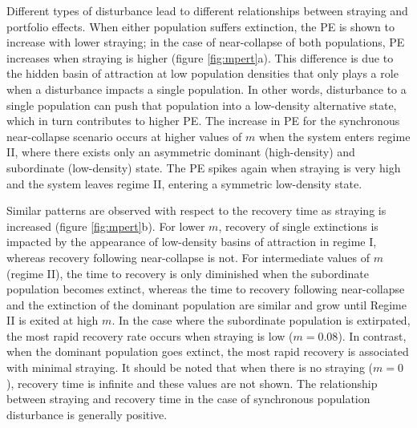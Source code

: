 \documentclass{revtex4}
\begin{document}
Different types of disturbance lead to different relationships between straying and portfolio effects.
When either population suffers extinction, the PE is shown to increase with lower straying; in the case of near-collapse of both populations, PE increases when straying is higher (figure \ref{fig:mpert}a).
This difference is due to the hidden basin of attraction at low population densities that only plays a role when a disturbance impacts a single population.
In other words, disturbance to a single population can push that population into a low-density alternative state, which in turn contributes to higher PE.
The increase in PE for the synchronous near-collapse scenario occurs at higher values of $m$ when the system enters regime II, where there exists only an asymmetric dominant (high-density) and subordinate (low-density) state.
The PE spikes again when straying is very high and the system leaves regime II, entering a symmetric low-density state.


Similar patterns are observed with respect to the recovery time as straying is increased (figure \ref{fig:mpert}b).
For lower $m$, recovery of single extinctions is impacted by the appearance of low-density basins of attraction in regime I, whereas recovery following near-collapse is not.
For intermediate values of $m$ (regime II), the time to recovery is only diminished when the subordinate population becomes extinct, whereas the time to recovery following near-collapse and the extinction of the dominant population are similar and grow until Regime II is exited at high $m$.
In the case where the subordinate population is extirpated, the most rapid recovery rate occurs when straying is low ($m = 0.08$). 
In contrast, when the dominant population goes extinct, the most rapid recovery is associated with minimal straying. 
It should be noted that when there is no straying ($m = 0$), recovery time is infinite and these values are not shown. 
The relationship between straying and recovery time in the case of synchronous population disturbance is generally positive.
\end{document}
